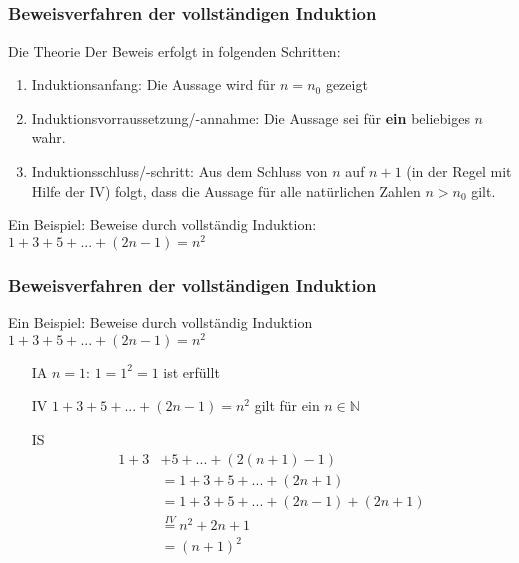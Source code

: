 \subsection*{}
\begin{frame}
	\frametitle{Beweisverfahren der vollständigen Induktion}
	\begin{block}{Die Theorie}
		Der Beweis erfolgt in folgenden Schritten:
		\begin{enumerate}
			\item Induktionsanfang: Die Aussage wird für $n=n_0$ gezeigt \pause
			\item Induktionsvorraussetzung/-annahme: Die Aussage sei für \textbf{ein}
			beliebiges  $n$ wahr. \pause
			\item Induktionsschluss/-schritt: Aus dem Schluss von $n$ auf $n+1$ (in der Regel mit Hilfe der IV) folgt, dass die Aussage für alle natürlichen Zahlen $n>n_0$ gilt.
		\end{enumerate}
	\end{block}

	\begin{block}{Ein Beispiel:}
	Beweise durch vollständig Induktion: 
	 $1+3+5+...+(2n-1)=n^2$
	\end{block}
	
\end{frame}

\begin{frame}
	\frametitle{Beweisverfahren der vollständigen Induktion}
	
	\begin{block}{Ein Beispiel:}
	Beweise durch vollständig Induktion $1+3+5+...+(2n-1)=n^2$
	
	\begin{itemize}
		\item[IA] $n=1$: $1=1^2=1$ ist erfüllt
		\item[IV]	$1+3+5+...+(2n-1)=n^2$ gilt für ein $n \in \mathbb{N}$
		\item[IS] \begin{equation}
				\begin{split}
					 1+3&+5+...+(2(n+1)-1) \nonumber\\
					&= 1+3+5+...+(2n+1) \nonumber\\
					&=1+3+5+...+(2n-1)+(2n+1) \nonumber\\
					&\overset{IV}{=} n^2+2n+1 \nonumber\\
					&=(n+1)^2
				\end{split}
			\end{equation}
    \end{itemize}
    \end{block}
	
\end{frame}


